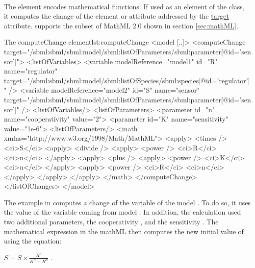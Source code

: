 \paragraph{}
\label{sec:math}

The  element encodes mathematical functions. 
If used as an element of the  class, it computes the change of the element or attribute addressed by the \hyperref[sec:target]{target} attribute.
\currentLV supports the subset of MathML 2.0 shown in section \ref{sec:mathML}.

%
\begin{myXmlLst}{The computeChange element}{lst:computeChange}
<model [..]>
    <computeChange target="/sbml:sbml/sbml:model/sbml:listOfParameters/sbml:parameter[@id='sensor']">
      <listOfVariables>
        <variable modelReference="model1" id="R" name="regulator" 
                  target="/sbml:sbml/sbml:model/sbml:listOfSpecies/sbml:species[@id='regulator']" />
        <variable modelReference="model2" id="S" name="sensor"
                  target="/sbml:sbml/sbml:model/sbml:listOfParameters/sbml:parameter[@id='sensor']" />
      <listOfVariables/>
      <listOfParameters>
        <parameter id="n" name="cooperativity" value="2">
        <parameter id="K" name="sensitivity" value="1e-6">
      <listOfParameters/>
      <math  xmlns="http://www.w3.org/1998/Math/MathML">
        <apply>
          <times />
          <ci>S</ci>
          <apply>
            <divide />
            <apply>
              <power />
              <ci>R</ci>
              <ci>n</ci>
            </apply>
            <apply>
              <plus />
              <apply>
                <power />
                <ci>K</ci>
                <ci>n</ci>
              </apply>
              <apply>
                <power />
                <ci>R</ci>
                <ci>n</ci>
              </apply>
            </apply> 
          </apply>
        </math>
    </computeChange>
  </listOfChanges>
</model>
\end{myXmlLst}
%

The example in  computes a change of the variable  of the model . To do so, it uses the value of the variable  coming from model . In addition, the calculation used two additional parameters, the cooperativity , and the sensitivity .
The mathematical expression in the mathML then computes the new initial value of  using the equation:

\begin{math}
S =  S \times \frac{R^{n}}{K^{n}+R^{n}}
\end{math}
.


